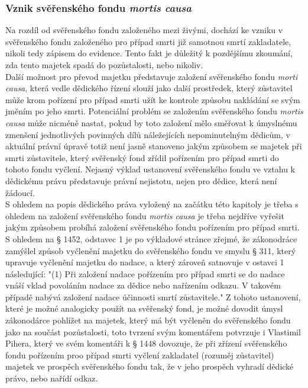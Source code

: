 \documentclass{article}
\begin{document}
\newpage
\thispagestyle{smallertextinheader}

\subsubsection{Vznik svěřenského fondu \textit{mortis causa}}

Na rozdíl od svěřenského fondu založeného mezi živými, dochází ke vzniku v svěřenského fondu založeného pro případ smrti již samotnou smrtí zakladatele, nikoli tedy zápisem do evidence. Tento fakt je důležitý k pozdějšímu zkoumání, zda tento majetek spadá do pozůstalosti, nebo nikoliv.\\

Další možnost pro převod majetku představuje založení svěřenského fondu \textit{morti causa}, která vedle dědického řízení slouží jako další prostředek, který zůstavitel může krom pořízení pro případ smrti užít ke kontrole způsobu nakládání se svým jměním po jeho smrti. Potenciální problém se založením svěřenského fondu \textit{mortis causa} může nicméně nastat, pokud by toto založení mělo směřovat k úmyslnému zmenšení jednotlivých povinných dílů náležejících nepominutelným dědicům, v aktuální právní úpravě totiž není jasně stanoveno jakým způsobem se majetek při smrti zůstavitele, který svěřenský fond zřídil pořízením pro případ smrti do tohoto fondu vyčlení. Nejasný výklad ustanovení svěřenského fondu ve vztahu k dědickému právu představuje právní nejistotu, nejen pro dědice, která není žádoucí. \\

S ohledem na popis dědického práva vyložený na začátku této kapitoly je třeba s ohledem na založení svěřenského fondu \textit{mortis causa} je třeba nejdříve vyřešit jakým způsobem probíhá založení svěřenského fondu pořízením pro případ smrti. S ohledem na § 1452, odstavec 1 je po výkladové stránce zřejmé, že zákonodráce zamýšlel způsob vyčlenění majetku do svěřenského fondu ve smyslu § 311, který upravuje vyčlenění majetku do nadace, a který zároveň satnovuje v ostavci 1 následující: "(1) Při založení nadace pořízením pro případ smrti se do nadace vnáší vklad povoláním nadace za dědice nebo nařízením odkazu. V takovém případě nabývá založení nadace účinnosti smrtí zůstavitele." Z tohoto ustanovení, které je možné analogicky použít na svěřenský fond, je možné dovodit úmysl zákonodárce pohlížet na majetek, který má být vyčleněn do svěřenského fondu jako na součást pozůstalosti, toto tvrzení svým komentářem potvrzuje i Vlastimil Pihera, který ve svém komentáři k § 1448 dovozuje, že při zřízení svěřenského fondu pořízením proo případ smrti vyčlení zakladatel (rozuměj zůstavitel) majetek ve prospěch svěřenského fondu tak, že v jeho prospěch vyhradí dědické právo, nebo nařídí odkaz. \\
\end{document}
